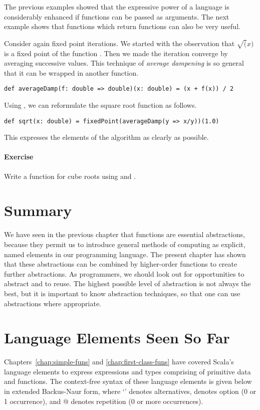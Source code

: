 \documentclass[a4paper,12pt,twoside,titlepage]{book}
\newcommand{\exercise}{\paragraph{Exercise}}
\begin{document}
The previous examples showed that the expressive power of a language
is considerably enhanced if functions can be passed as arguments.  The
next example shows that functions which return functions can also be
very useful.

Consider again fixed point iterations. We started with the observation
that $\sqrt(x)$ is a fixed point of the function .
Then we made the iteration converge by averaging successive values.
This technique of {\em average dampening} is so general that it
can be wrapped in another function.
\begin{lstlisting}
def averageDamp(f: double => double)(x: double) = (x + f(x)) / 2
\end{lstlisting}
Using , we can reformulate the square root function
as follows.
\begin{lstlisting}
def sqrt(x: double) = fixedPoint(averageDamp(y => x/y))(1.0)
\end{lstlisting}
This expresses the elements of the algorithm as clearly as possible.

\exercise Write a function for cube roots using  and 
.

\section{Summary}

We have seen in the previous chapter that functions are essential
abstractions, because they permit us to introduce general methods of
computing as explicit, named elements in our programming language.
The present chapter has shown that these abstractions can be combined
by higher-order functions to create further abstractions.  As
programmers, we should look out for opportunities to abstract and to
reuse. The highest possible level of abstraction is not always the
best, but it is important to know abstraction techniques, so that one
can use abstractions where appropriate.

\section{Language Elements Seen So Far}

Chapters~\ref{chap:simple-funs} and \ref{chap:first-class-funs} have
covered Scala's language elements to express expressions and types
comprising of primitive data and functions.  The context-free syntax
of these language elements is given below in extended Backus-Naur
form, where `\code{|}' denotes alternatives, \code{[...]} denotes
option (0 or 1 occurrence), and @ denotes repetition
(0 or more occurrences).
\end{document}
